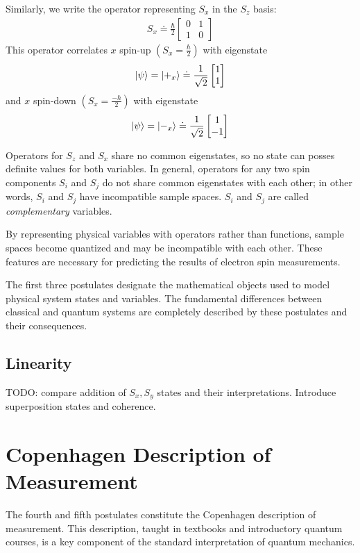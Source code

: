 Similarly, we write the operator representing $S_x$ in the $S_z$ basis:
\begin{align}
        S_x \doteq \frac{\hbar}{2}\begin{bmatrix} 0 & 1 \\ 1 & 0 \end{bmatrix}
\end{align}
This operator correlates $x$ spin-up $\left(S_x = \frac{\hbar}{2}\right)$ with eigenstate
\begin{align}
    \ket{\psi} = \ket{+_x} \doteq \frac{1}{\sqrt{2}}\begin{bmatrix} 1 \\ 1 \end{bmatrix}
\end{align}
and $x$ spin-down $\left(S_x = \frac{-\hbar}{2}\right)$ with eigenstate
\begin{align}
    \ket{\psi} = \ket{-_x} \doteq \frac{1}{\sqrt{2}}\begin{bmatrix} 1 \\ -1 \end{bmatrix}
\end{align}

Operators for $S_z$ and $S_x$ share no common eigenstates, so no state can posses definite values for both variables. In general, operators for any two spin components $S_i$ and $S_j$ do not share common eigenstates with each other; in other words, $S_i$ and $S_j$ have incompatible sample spaces. $S_i$ and $S_j$ are called \textit{complementary} variables.

By representing physical variables with operators rather than functions, sample spaces become quantized and may be incompatible with each other. These features are necessary for predicting the results of electron spin measurements.

The first three postulates designate the mathematical objects used to model physical system states and variables. The fundamental differences between classical and quantum systems are completely described by these postulates and their consequences.

\subsection{Linearity}
TODO: compare addition of $S_x, S_y$ states and their interpretations. Introduce superposition states and coherence.

\section{Copenhagen Description of Measurement}
The fourth and fifth postulates constitute the Copenhagen description of measurement. This description, taught in textbooks and introductory quantum courses, is a key component of the standard interpretation of quantum mechanics.

